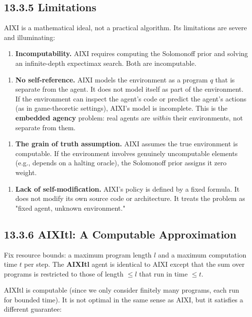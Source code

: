 \subsection{13.3.5 Limitations}

AIXI is a mathematical ideal, not a practical algorithm. Its limitations are severe and illuminating:

\begin{enumerate}
  \item \textbf{Incomputability.} AIXI requires computing the Solomonoff prior and solving an infinite-depth expectimax search. Both are incomputable.
\end{enumerate}

\begin{enumerate}
  \item \textbf{No self-reference.} AIXI models the environment as a program $q$ that is separate from the agent. It does not model itself as part of the environment. If the environment can inspect the agent's code or predict the agent's actions (as in game-theoretic settings), AIXI's model is incomplete. This is the \textbf{embedded agency} problem: real agents are \textit{within} their environments, not separate from them.
\end{enumerate}

\begin{enumerate}
  \item \textbf{The grain of truth assumption.} AIXI assumes the true environment is computable. If the environment involves genuinely uncomputable elements (e.g., depends on a halting oracle), the Solomonoff prior assigns it zero weight.
\end{enumerate}

\begin{enumerate}
  \item \textbf{Lack of self-modification.} AIXI's policy is defined by a fixed formula. It does not modify its own source code or architecture. It treats the problem as "fixed agent, unknown environment."
\end{enumerate}

\subsection{13.3.6 AIXItl: A Computable Approximation}

\begin{definition}
Fix resource bounds: a maximum program length $l$ and a maximum computation time $t$ per step. The \textbf{AIXItl} agent is identical to AIXI except that the sum over programs is restricted to those of length $\leq l$ that run in time $\leq t$.

AIXItl is computable (since we only consider finitely many programs, each run for bounded time). It is not optimal in the same sense as AIXI, but it satisfies a different guarantee:
\end{definition}

